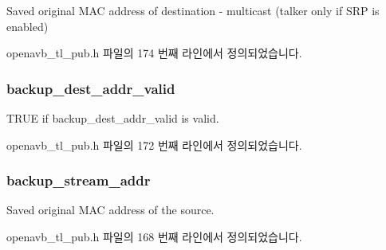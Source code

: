 Saved original M\+AC address of destination -\/ multicast (talker only if S\+RP is enabled) 



openavb\+\_\+tl\+\_\+pub.\+h 파일의 174 번째 라인에서 정의되었습니다.

\subsubsection[{\texorpdfstring{backup\+\_\+dest\+\_\+addr\+\_\+valid}{backup_dest_addr_valid}}]{ backup\+\_\+dest\+\_\+addr\+\_\+valid}\hypertarget{structopenavb__tl__cfg__t_a34a2e8da45008a86cef126647be52472}{}\label{structopenavb__tl__cfg__t_a34a2e8da45008a86cef126647be52472}


T\+R\+UE if backup\+\_\+dest\+\_\+addr\+\_\+valid is valid. 



openavb\+\_\+tl\+\_\+pub.\+h 파일의 172 번째 라인에서 정의되었습니다.

\subsubsection[{\texorpdfstring{backup\+\_\+stream\+\_\+addr}{backup_stream_addr}}]{ backup\+\_\+stream\+\_\+addr}\hypertarget{structopenavb__tl__cfg__t_a286edaef3000edeca172ff0af9c899bf}{}\label{structopenavb__tl__cfg__t_a286edaef3000edeca172ff0af9c899bf}


Saved original M\+AC address of the source. 



openavb\+\_\+tl\+\_\+pub.\+h 파일의 168 번째 라인에서 정의되었습니다.

